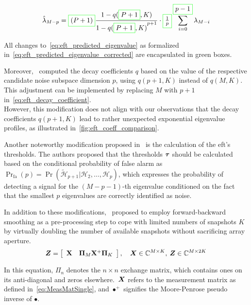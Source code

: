 \begin{equation}
    \hat{\lambda}_{M-p} = \gnbxeq{(P+1)}\frac{1 - q(\gnbxeq{P+1}, K)}{1 - {q(\gnbxeq{P+1}, K)}^{p + 1}} \cdot \gnbxeq{\frac{1}{p}}\sum_{i=0}^{\gnbxeq{p-1}}\lambda_{M-i}
    \label{eq:eft_predicted_eigenvalue_corrected}
\end{equation}

All changes to~\autoref{eq:eft_predicted_eigenvalue} as formalized in~\autoref{eq:eft_predicted_eigenvalue_corrected} are
encapsulated in green boxes.

Moreover,~\cite{costa2007} computed the decay coefficients \( q \) based on the value of the respective candidate noise
subspace dimension \( p \), using \( q(p+1, K) \) instead of \( q(M, K) \).
This adjustment can be implemented by replacing \( M \) with \( p+1 \) in~\autoref{eq:eft_decay_coefficient}. \\
However, this modification does not align with our observations that the decay coefficients \( q(p+1, K) \)
lead to rather unexpected exponential eigenvalue profiles, as illustrated in~\autoref{fig:eft_coeff_comparison}.

Another noteworthy modification proposed in~\cite{costa2009} is the calculation of the \gls{eft}'s thresholds.
The authors proposed that the thresholds \( \boldsymbol{\tau} \) should be calculated based on the conditional probability of false
alarm as \( \Pr_{\text{fa}}(p) = \Pr(\widetilde{\mathcal{H}}_{p+1}| \mathcal{H}_2, \ldots, \mathcal{H}_p) \), which expresses
the probability of detecting a signal for the \( (M - p - 1) \)-th
eigenvalue conditioned on the fact that the smallest \( p \) eigenvalues are correctly identified as noise.

In addition to these modifications,~\cite{costa2007} proposed to employ forward-backward smoothing as a pre-processing step to cope with limited
numbers of snapshots \( K \) by virtually doubling the number of available snapshots without sacrificing array aperture.
\begin{equation}
    \boldsymbol{Z}= \left[\begin{array}{ll} \mathbf{X} & \mathbf{\Pi}_M \mathbf{X}^+ \mathbf{\Pi}_K\end{array}\right], \quad \boldsymbol{X} \in \mathbb{C}^{M \times K}, \:\boldsymbol{Z} \in \mathbb{C}^{M \times 2 K}
\end{equation}

In this equation, \( \Pi_n \) denotes the \(n \times n \) exchange matrix, which contains ones on its anti-diagonal and
zeros elsewhere.~\( \boldsymbol{X} \) refers to the measurement matrix as defined in~\autoref{eq:MeasMatSingle}, and \( \bullet^+ \)
signifies the Moore-Penrose pseudo inverse of \( \bullet \).

